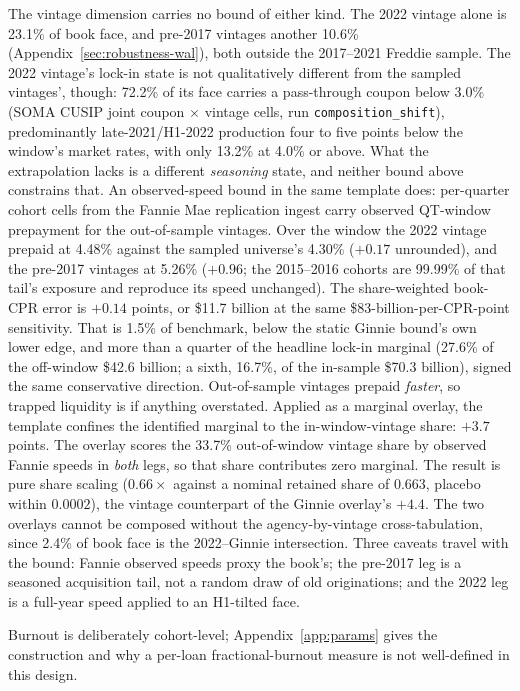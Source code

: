 \documentclass[12pt]{article}
\begin{document}
The vintage dimension carries no bound of either kind. The 2022 vintage alone is 23.1\% of book face, and pre-2017 vintages another 10.6\% (Appendix~\ref{sec:robustness-wal}), both outside the 2017--2021 Freddie sample. The 2022 vintage's lock-in state is not qualitatively different from the sampled vintages', though: 72.2\% of its face carries a pass-through coupon below 3.0\% (SOMA CUSIP joint coupon $\times$ vintage cells, run \texttt{composition\_shift}), predominantly late-2021/H1-2022 production four to five points below the window's market rates, with only 13.2\% at 4.0\% or above. What the extrapolation lacks is a different \emph{seasoning} state, and neither bound above constrains that. An observed-speed bound in the same template does: per-quarter cohort cells from the Fannie Mae replication ingest carry observed QT-window prepayment for the out-of-sample vintages. Over the window the 2022 vintage prepaid at 4.48\% against the sampled universe's 4.30\% ($+0.17$ unrounded), and the pre-2017 vintages at 5.26\% ($+0.96$; the 2015--2016 cohorts are 99.99\% of that tail's exposure and reproduce its speed unchanged). The share-weighted book-CPR error is $+0.14$ points, or \$11.7 billion at the same \$83-billion-per-CPR-point sensitivity. That is 1.5\% of benchmark, below the static Ginnie bound's own lower edge, and more than a quarter of the headline lock-in marginal (27.6\% of the off-window \$42.6 billion; a sixth, 16.7\%, of the in-sample \$70.3 billion), signed the same conservative direction. Out-of-sample vintages prepaid \emph{faster}, so trapped liquidity is if anything overstated. Applied as a marginal overlay, the template confines the identified marginal to the in-window-vintage share: $+3.7$ points. The overlay scores the 33.7\% out-of-window vintage share by observed Fannie speeds in \emph{both} legs, so that share contributes zero marginal. The result is pure share scaling ($0.66\times$ against a nominal retained share of $0.663$, placebo within $0.0002$), the vintage counterpart of the Ginnie overlay's $+4.4$. The two overlays cannot be composed without the agency-by-vintage cross-tabulation, since 2.4\% of book face is the 2022--Ginnie intersection. Three caveats travel with the bound: Fannie observed speeds proxy the book's; the pre-2017 leg is a seasoned acquisition tail, not a random draw of old originations; and the 2022 leg is a full-year speed applied to an H1-tilted face.

Burnout is deliberately cohort-level; Appendix~\ref{app:params} gives the construction and why a per-loan fractional-burnout measure is not well-defined in this design.
\end{document}
